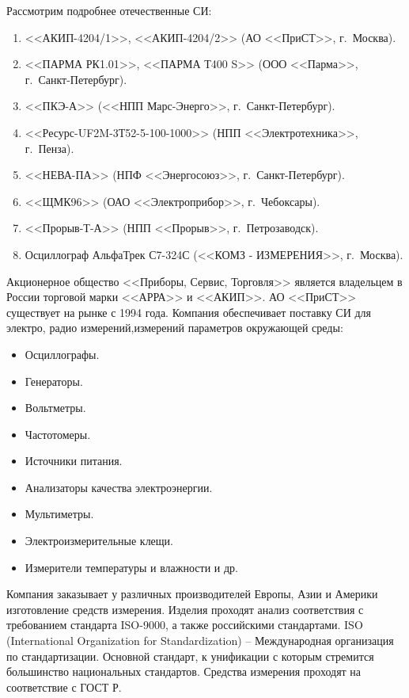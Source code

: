 Рассмотрим подробнее отечественные СИ:
\begin{enumerate}
	\item <<АКИП-4204/1>>, <<АКИП-4204/2>> (АО <<ПриСТ>>, г.~Москва).
	\item <<ПАРМА РК1.01>>, <<ПАРМА Т400 S>> (ООО <<Парма>>, г.~Санкт-Петербург).
	\item <<ПКЭ-А>> (<<НПП Марс-Энерго>>, г.~Санкт-Петербург).
	\item <<Ресурс-UF2M-3Т52-5-100-1000>> (НПП <<Электротехника>>, г.~Пенза).
	\item <<НЕВА-ПА>> (НПФ <<Энергосоюз>>, г.~Санкт-Петербург).
	\item <<ЩМК96>> (ОАО <<Электроприбор>>, г.~Чебоксары).
	\item <<Прорыв-Т-А>> (НПП <<Прорыв>>, г.~Петрозаводск).
	\item Осциллограф АльфаТрек С7-324С (<<КОМЗ - ИЗМЕРЕНИЯ>>, г.~Москва).
\end{enumerate}

Акционерное общество <<Приборы, Сервис, Торговля>>\cite{prist}  является владельцем в России торговой марки <<АРРА>> и <<АКИП>>.
АО <<ПриСТ>> существует на рынке с 1994 года.
Компания обеспечивает поставку СИ для электро, радио измерений,измерений параметров окружающей среды:
\begin{itemize}
	\item Осциллографы.
	\item Генераторы.
	\item Вольтметры.
	\item Частотомеры.
	\item Источники питания.
	\item Анализаторы качества электроэнергии.
	\item Мультиметры.
	\item Электроизмерительные клещи.
	\item Измерители температуры и влажности и др.
\end{itemize}

Компания заказывает у различных производителей Европы, Азии и Америки изготовление средств измерения. Изделия проходят анализ соответствия с требованием стандарта ISO-9000, а также российскими стандартами. ISO (International Organization for Standardization) -- Международная организация по стандартизации. Основной стандарт, к унификации с которым стремится большинство национальных стандартов. Средства измерения проходят на соответствие с ГОСТ Р. 

